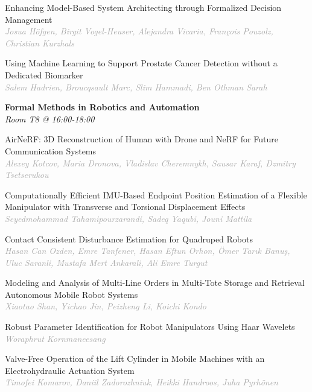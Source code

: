 \begin{multicols*}{2}
\small Enhancing Model-Based System Architecting through Formalized Decision Management\\ 
\footnotesize \textcolor{darkgray}{\textit{Josua Höfgen, Birgit  Vogel-Heuser, Alejandra  Vicaria, François  Pouzolz, Christian  Kurzhals}}

\small Using Machine Learning to Support Prostate Cancer Detection without a Dedicated Biomarker\\ 
\footnotesize \textcolor{darkgray}{\textit{Salem Hadrien, Broucqsault  Marc, Slim  Hammadi, Ben Othman  Sarah}}

\normalsize \textbf{Formal Methods in Robotics and Automation}\\
\small \textit{Room T8 @ 16:00-18:00}

\small AirNeRF: 3D Reconstruction of Human with Drone and NeRF for Future Communication Systems\\ 
\footnotesize \textcolor{darkgray}{\textit{Alexey Kotcov, Maria  Dronova, Vladislav  Cheremnykh, Sausar  Karaf, Dzmitry  Tsetserukou}}

\small Computationally Efficient IMU-Based Endpoint Position Estimation of a Flexible Manipulator with Transverse and Torsional Displacement Effects\\ 
\footnotesize \textcolor{darkgray}{\textit{Seyedmohammad Tahamipourzarandi, Sadeq  Yaqubi, Jouni  Mattila}}

\small Contact Consistent Disturbance Estimation for Quadruped Robots\\ 
\footnotesize \textcolor{darkgray}{\textit{Hasan Can Ozden, Emre  Tanfener, Hasan Eftun  Orhon, Ömer Tarık Banuş, Uluc  Saranli, Mustafa Mert  Ankarali, Ali Emre Turgut}}

\small Modeling and Analysis of Multi-Line Orders in Multi-Tote Storage and Retrieval Autonomous Mobile Robot Systems\\ 
\footnotesize \textcolor{darkgray}{\textit{Xiaotao Shan, Yichao  Jin, Peizheng  Li, Koichi  Kondo}}

\small Robust Parameter Identification for Robot Manipulators Using Haar Wavelets\\ 
\footnotesize \textcolor{darkgray}{\textit{Woraphrut Kornmaneesang}}

\small Valve-Free Operation of the Lift Cylinder in Mobile Machines with an Electrohydraulic Actuation System\\ 
\footnotesize \textcolor{darkgray}{\textit{Timofei Komarov, Daniil  Zadorozhniuk, Heikki  Handroos, Juha  Pyrhönen}}


\end{multicols*}
